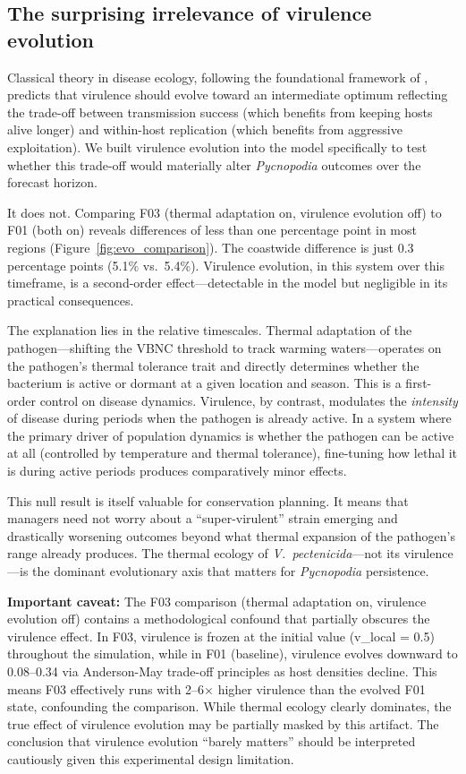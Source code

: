 \subsection{The surprising irrelevance of virulence evolution}
\label{sec:findings_virulence}

Classical theory in disease ecology, following the foundational framework of
\citet{anderson1982}, predicts that virulence should evolve toward an
intermediate optimum reflecting the trade-off between transmission success
(which benefits from keeping hosts alive longer) and within-host replication
(which benefits from aggressive exploitation). We built virulence evolution
into the model specifically to test whether this trade-off would materially
alter \textit{Pycnopodia} outcomes over the forecast horizon.

It does not. Comparing F03 (thermal adaptation on, virulence evolution off)
to F01 (both on) reveals differences of less than one percentage point in
most regions (Figure~\ref{fig:evo_comparison}). The coastwide difference is
just 0.3 percentage points (5.1\% vs.\ 5.4\%). Virulence evolution, in this
system over this timeframe, is a second-order effect---detectable in the model
but negligible in its practical consequences.

The explanation lies in the relative timescales. Thermal adaptation of the
pathogen---shifting the VBNC threshold to track warming waters---operates on
the pathogen's thermal tolerance trait and directly determines whether the
bacterium is active or dormant at a given location and season. This is a
first-order control on disease dynamics. Virulence, by contrast, modulates
the \textit{intensity} of disease during periods when the pathogen is already
active. In a system where the primary driver of population dynamics is whether
the pathogen can be active at all (controlled by temperature and thermal
tolerance), fine-tuning how lethal it is during active periods produces
comparatively minor effects.

This null result is itself valuable for conservation planning. It means that
managers need not worry about a ``super-virulent'' strain emerging and
drastically worsening outcomes beyond what thermal expansion of the pathogen's
range already produces. The thermal ecology of \textit{V.\ pectenicida}---not
its virulence---is the dominant evolutionary axis that matters for
\textit{Pycnopodia} persistence.

\textbf{Important caveat:} The F03 comparison (thermal adaptation on, virulence 
evolution off) contains a methodological confound that partially obscures the 
virulence effect. In F03, virulence is frozen at the initial value (v\_local = 0.5) 
throughout the simulation, while in F01 (baseline), virulence evolves downward 
to 0.08--0.34 via Anderson-May trade-off principles as host densities decline. 
This means F03 effectively runs with 2--6× higher virulence than the evolved 
F01 state, confounding the comparison. While thermal ecology clearly dominates, 
the true effect of virulence evolution may be partially masked by this artifact. 
The conclusion that virulence evolution ``barely matters'' should be interpreted 
cautiously given this experimental design limitation.

